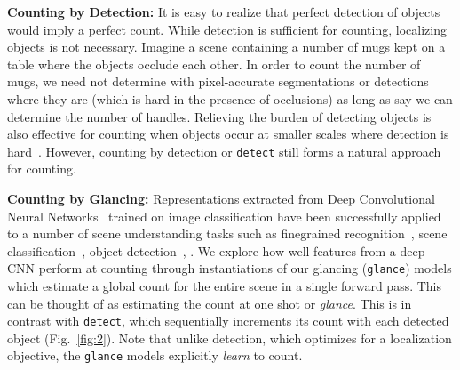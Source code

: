 \documentclass[10pt,twocolumn,letterpaper]{article}
\newcommand{\detect}{\texttt{detect}\xspace}
\newcommand{\glance}{\texttt{glance}\xspace}
\begin{document}
\noindent \textbf{Counting by Detection:} 
It is easy to realize that perfect detection of objects would imply a perfect count.
While detection is sufficient for counting, localizing objects is not necessary.
Imagine a scene containing a number of mugs kept on a table where the objects occlude each other. In order to count the number of mugs, we need not determine with pixel-accurate segmentations or detections where they are (which is hard in the presence of occlusions) as long as say we can determine the number of handles. Relieving the burden of detecting objects is also effective for counting when objects occur at smaller scales where detection is hard~\cite{Girshick2015FastR-CNN}.
However, counting by detection or \detect still forms a natural approach for counting.
\begin{comment}
On counting and detection
\begin{itemize}
\item It is easy to realize that perfect detection would get us perfect count
\item Thus, detection is clearly sufficient for counting
\item However, it is note necessary to detect objects well for counting
\item Indeed, we find that detectors when run at operating points other than the optimal, give better counting performance
\item Detection is clearly a natural approach or (\rama{baseline?}) for counting
\end{itemize}
\end{comment}



\noindent \textbf{Counting by Glancing:} Representations extracted from Deep Convolutional Neural Networks~\cite{Simonyan2014VeryRecognition,Krizhevsky2012ImageNetNetworks} trained on image classification have been successfully applied to a number of scene understanding tasks such as finegrained recognition~\cite{Donahue2013DeCAF:Recognition}, scene classification~\cite{Donahue2013DeCAF:Recognition}, object detection~\cite{Donahue2013DeCAF:Recognition}, \etc.
We explore how well features from a deep CNN perform at counting through instantiations of our glancing (\glance) models which estimate a global count for the entire scene in a single forward pass. This can be thought of as estimating the count at one shot or \emph{glance}. This is in contrast with \detect, which sequentially increments its count with each detected object (Fig.~\ref{fig:2}). Note that unlike detection, which optimizes for a localization objective, the \glance models explicitly \textit{learn} to count.
\end{document}
